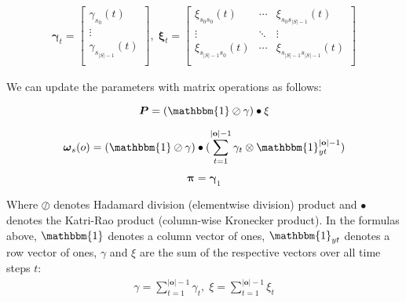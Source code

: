 \begin{align}
    \boldsymbol{\gamma}_t = \begin{bmatrix}
                                \gamma_{s_0}(t)       \\
                                \vdots                \\
                                \gamma_{s_{|S|-1}}(t) \\
    \end{bmatrix}, \;
    \boldsymbol{\xi}_t = \begin{bmatrix}
                             \xi_{s_0 s_0}(t)      & \cdots & \xi_{s_0 s_{|S|-1}}(t)      \\
                             \vdots                & \ddots & \vdots                      \\
                             \xi_{s_{|S|-1}s_0}(t) & \cdots & \xi_{s_{|S|-1}s_{|S|-1}}(t) \\
    \end{bmatrix}
\end{align}

We can update the parameters with matrix operations as follows:

\begin{equation}
    \boldsymbol{P} = (\mathbbm{1} \oslash \gamma) \bullet \xi
    \label{eq:transition-probabilities-update}
\end{equation}

\begin{equation}
    \boldsymbol{\omega}_s(o) = (\mathbbm{1} \oslash \gamma) \bullet (\sum_{t=1}^{|\mathbf{o}|-1} \gamma_t \otimes \mathbbm{1}_{yt}^{|\mathbf{o}|-1})
    \label{eq:omega-update}
\end{equation}

\begin{equation}
    \boldsymbol{\pi} = \boldsymbol{\gamma}_1
    \label{eq:initial-probabilities-update}
\end{equation}

Where $\oslash$ denotes Hadamard division (elementwise division) product and $\bullet$ denotes the Katri-Rao product (column-wise Kronecker product).
In the formulas above, $\mathbbm{1}$ denotes a column vector of ones, $\mathbbm{1}_{yt}$ denotes a row vector of ones, $\gamma$ and $\xi$ are the sum of the respective vectors over all time steps $t$:
\begin{align}
    \gamma = \sum_{t=1}^{|\mathbf{o}|-1} \gamma_t, \;
    \xi = \sum_{t=1}^{|\mathbf{o}|-1} \xi_t
\end{align} 

